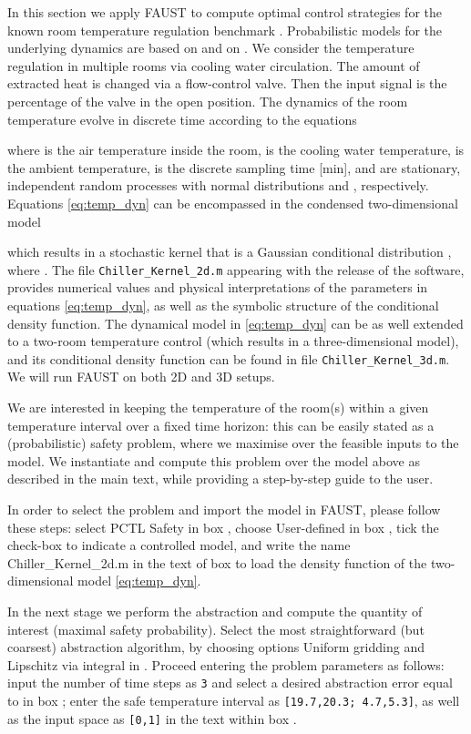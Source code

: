 \documentclass{llncs}
\newcommand*\circled[1]{\tikz[baseline=(char.base)]{\node[shape=circle,draw,inner sep=0.5pt] (char) {#1};}}
\newcommand{\software}{\textsf{FAUST}\xspace}
\newcommand{\boxname}[1]{\textsf{#1}}
\begin{document}
In this section we apply \software to compute optimal control strategies for the known room temperature regulation benchmark \cite{FI04}.  
Probabilistic models for the underlying dynamics are based on \cite{MC85} and on \cite{APLS08}.
We consider the temperature regulation in multiple rooms via cooling water circulation.
The amount of extracted heat is changed via a flow-control valve.
Then the input signal is the percentage of the valve in the open position. 
The dynamics of the room temperature evolve in discrete time according to the equations 

where  is the air temperature inside the room,
 is the cooling water temperature,
 is the ambient temperature,
 is the discrete sampling time [min],
and
 are stationary, independent random processes 
with normal distributions  and , respectively.
Equations \eqref{eq:temp_dyn} can be encompassed in the condensed two-dimensional model 

which results in a stochastic kernel that is a Gaussian conditional distribution , 
where . 
The file \texttt{Chiller\_Kernel\_2d.m}
appearing with the release of the software,
provides numerical values and physical interpretations of the parameters in equations \eqref{eq:temp_dyn}, 
as well as the symbolic structure of the conditional density function.
The dynamical model in \eqref{eq:temp_dyn} can be as well extended to a two-room temperature control (which results in a three-dimensional model), 
and its conditional density function can be found in file \texttt{Chiller\_Kernel\_3d.m}. 
We will run \software on both 2D and 3D setups. 

We are interested in keeping the temperature of the room(s) within a given temperature interval over a fixed time horizon: 
this can be easily stated as a (probabilistic) safety problem, 
where we maximise over the feasible inputs to the model. 
We instantiate and compute this problem over the model above as described in the main text, 
while providing a step-by-step guide to the user.

In order to select the problem and import the model in \software, please follow these steps:
select \boxname{PCTL Safety} in box \circled{1},
choose \boxname{User-defined} in box \circled{2},
tick the check-box \circled{3} to indicate a controlled model,
and write the name \boxname{Chiller\_Kernel\_2d.m} in the text of box \circled{7} to load the density function of the two-dimensional model \eqref{eq:temp_dyn}.

In the next stage we perform the abstraction and compute the quantity of interest (maximal safety probability). 
Select the most straightforward (but coarsest) abstraction algorithm, 
by choosing options \boxname{Uniform gridding} and \boxname{Lipschitz via integral} in \circled{4}. 
Proceed entering the problem parameters as follows:
input the number of time steps as \texttt{3} and select a desired abstraction error equal to  in box \circled{5}; 
enter the safe temperature interval  as \texttt{[19.7,20.3; 4.7,5.3]}, 
as well as the input space  as \texttt{[0,1]}
in the text within box \circled{8}. 
\end{document}
